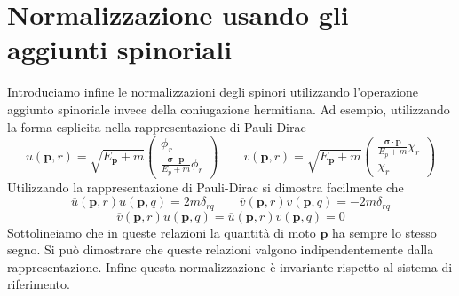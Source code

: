 \section{Normalizzazione usando gli aggiunti spinoriali}
Introduciamo infine le normalizzazioni degli spinori utilizzando l'operazione aggiunto spinoriale invece della coniugazione hermitiana. Ad esempio, utilizzando la forma esplicita nella rappresentazione di Pauli-Dirac
$$
u(\mathbf{p}, r) = \sqrt{E_\mathbf{p} + m} \begin{pmatrix} \phi_r \\ \frac{\boldsymbol{\sigma} \cdot \mathbf{p}}{E_p + m} \phi_r \end{pmatrix} \qquad v(\mathbf{p}, r) = \sqrt{E_\mathbf{p} + m} \begin{pmatrix} \frac{\boldsymbol{\sigma} \cdot \mathbf{p}}{E_p + m} \chi_r \\ \chi_r \end{pmatrix}
$$
Utilizzando la rappresentazione di Pauli-Dirac si dimostra facilmente che
$$
\overline{u}(\mathbf{p}, r) u(\mathbf{p}, q) = 2m\delta_{rq} \qquad \overline{v}(\mathbf{p}, r) v(\mathbf{p}, q) = -2m\delta_{rq}
$$
$$
\overline{v}(\mathbf{p}, r) u(\mathbf{p}, q) = \overline{u}(\mathbf{p}, r) v(\mathbf{p}, q) = 0
$$
Sottolineiamo che in queste relazioni la quantità di moto $\mathbf{p}$ ha sempre lo stesso segno. Si può dimostrare che queste relazioni valgono indipendentemente dalla rappresentazione. Infine questa normalizzazione è invariante rispetto al sistema di riferimento.
